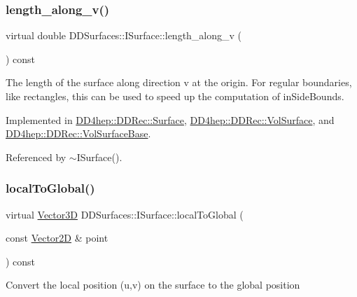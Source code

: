 \subsubsection{\texorpdfstring{length\+\_\+along\+\_\+v()}{length\_along\_v()}}
{\footnotesize\ttfamily virtual double D\+D\+Surfaces\+::\+I\+Surface\+::length\+\_\+along\+\_\+v (\begin{DoxyParamCaption}{ }\end{DoxyParamCaption}) const\hspace{0.3cm}{\ttfamily [pure virtual]}}

The length of the surface along direction v at the origin. For \textquotesingle{}regular\textquotesingle{} boundaries, like rectangles, this can be used to speed up the computation of in\+Side\+Bounds. 

Implemented in \hyperlink{class_d_d4hep_1_1_d_d_rec_1_1_surface_ad28657a514fe91a4f5fa74cec1c3888d}{D\+D4hep\+::\+D\+D\+Rec\+::\+Surface}, \hyperlink{class_d_d4hep_1_1_d_d_rec_1_1_vol_surface_aedd64d718c81b62fdad1094379190f81}{D\+D4hep\+::\+D\+D\+Rec\+::\+Vol\+Surface}, and \hyperlink{class_d_d4hep_1_1_d_d_rec_1_1_vol_surface_base_a638bb48002c1108d801c39949ac7d675}{D\+D4hep\+::\+D\+D\+Rec\+::\+Vol\+Surface\+Base}.



Referenced by $\sim$\+I\+Surface().

\hypertarget{class_d_d_surfaces_1_1_i_surface_a39651d79f7969ac7402a6e2cfc37803c}{}\label{class_d_d_surfaces_1_1_i_surface_a39651d79f7969ac7402a6e2cfc37803c} 
\subsubsection{\texorpdfstring{local\+To\+Global()}{localToGlobal()}}
{\footnotesize\ttfamily virtual \hyperlink{class_d_d_surfaces_1_1_vector3_d}{Vector3D} D\+D\+Surfaces\+::\+I\+Surface\+::local\+To\+Global (\begin{DoxyParamCaption}\item[{const \hyperlink{class_d_d_surfaces_1_1_vector2_d}{Vector2D} \&}]{point }\end{DoxyParamCaption}) const\hspace{0.3cm}{\ttfamily [pure virtual]}}

Convert the local position (u,v) on the surface to the global position 

